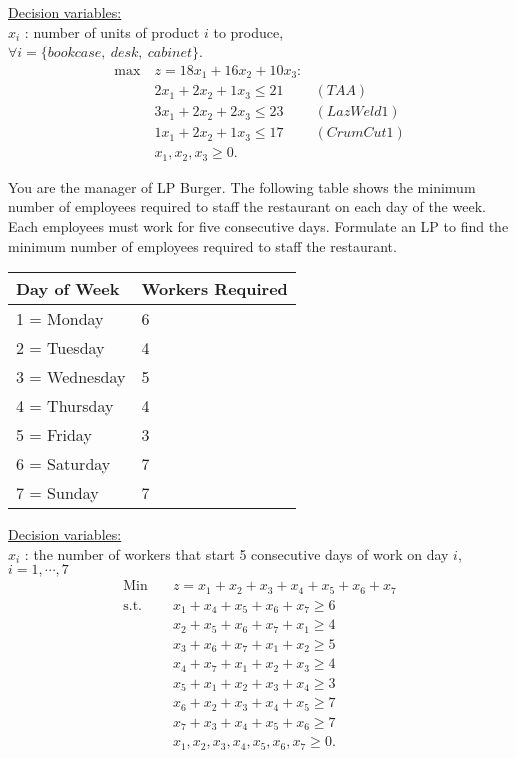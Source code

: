\medskip \underline{Decision variables:} \\
$x_i$ : number of units of product $i$ to produce, \\
$\forall i = \{bookcase,~desk,~cabinet\}$.
\begin{align*}
\max~& z = 18x_1 + 16x_2 + 10x_3 :  \\
& 2x_1 + 2x_2 + 1x_3 \le 21 & (TAA) \\
& 3x_1 + 2x_2 + 2x_3 \le 23 & (LazWeld1) \\
&  1x_1 + 2x_2 + 1x_3 \le 17 & (CrumCut1)  \\
& x_1, x_2, x_3 \ge 0.
\end{align*}





 You are the manager of LP Burger. The following table shows the minimum number of employees required to staff the restaurant on each day of the week. Each employees must work for five consecutive days. Formulate an LP to find the minimum number of employees required to staff the restaurant.

\begin{table}[h!] \begin{center} \begin{tabular} {|l|l|} 
\hline Day of Week & Workers Required   \\ \hline
\hline  1 = Monday & 6  \\
\hline  2 = Tuesday & 4  \\
\hline  3 = Wednesday & 5  \\
\hline  4 = Thursday & 4  \\
\hline  5 = Friday & 3  \\
\hline  6 = Saturday & 7  \\
\hline  7 = Sunday & 7  \\
\hline \end{tabular} \end{center} \end{table}

\underline{Decision variables:} \\
$x_i$ : the number of workers that start 5 consecutive days of work on day $i$, $ i = 1,\cdots,7$ \\

\begin{align*}
\mbox{Min~~ } & z = x_1 + x_2 + x_3 + x_4 + x_5 + x_6 + x_7  \\
\mbox{s.t.~~} & x_1 + x_4 + x_5 + x_6 + x_7 \ge 6 \\
& x_2 + x_5 + x_6 + x_7 + x_1 \ge 4 \\
& x_3 + x_6 + x_7 + x_1 + x_2 \ge 5 \\
& x_4 + x_7 + x_1 + x_2 + x_3 \ge 4 \\
& x_5 + x_1 + x_2 + x_3 + x_4 \ge 3 \\
& x_6 + x_2 + x_3 + x_4 + x_5 \ge 7 \\
& x_7 + x_3 + x_4 + x_5 + x_6 \ge 7 \\
& x_1, x_2, x_3, x_4, x_5, x_6, x_7 \ge 0.
\end{align*}

